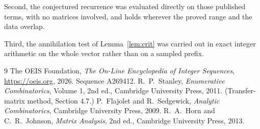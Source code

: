 \documentclass[11pt,a4paper]{article}
\theoremstyle{plain}
\theoremstyle{definition}
\begin{document}
Second, the conjectured recurrence was evaluated directly on those published terms, with no
matrices involved, and holds wherever the proved range and the data overlap.

Third, the annihilation test of Lemma~\ref{lem:crit} was carried out in exact integer
arithmetic on the whole vector rather than on a sampled prefix.

\begin{thebibliography}{9}
 The OEIS Foundation, \emph{The On-Line Encyclopedia of Integer
Sequences}, \url{https://oeis.org}, 2026. Sequence A269412.
 R.~P.~Stanley, \emph{Enumerative Combinatorics}, Volume 1, 2nd ed.,
Cambridge University Press, 2011. (Transfer-matrix method, Section 4.7.)
 P.~Flajolet and R.~Sedgewick, \emph{Analytic Combinatorics}, Cambridge
University Press, 2009.
 R.~A.~Horn and C.~R.~Johnson, \emph{Matrix Analysis}, 2nd ed., Cambridge
University Press, 2013.
\end{thebibliography}
\end{document}
